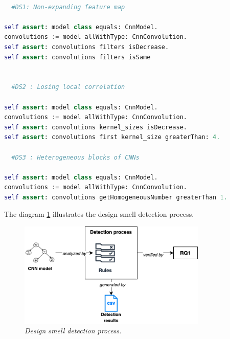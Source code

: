 \begin{lstlisting}[language=Python, caption=\emph{Rules examples for detecting design smells in CNN programs.}\\, label=lst:rules]

  #DS1: Non-expanding feature map

self assert: model class equals: CnnModel.
convolutions := model allWithType: CnnConvolution.
self assert: convolutions filters isDecrease.
self assert: convolutions filters isSame


  #DS2 : Losing local correlation

self assert: model class equals: CnnModel.
convolutions := model allWithType: CnnConvolution.
self assert: convolutions kernel_sizes isDecrease.
self assert: convolutions first kernel_size greaterThan: 4.

  #DS3 : Heterogeneous blocks of CNNs

self assert: model class equals: CnnModel.
convolutions := model allWithType: CnnConvolution.
self assert: convolutions getHomogeneousNumber greaterThan 1.

\end{lstlisting}



The diagram \ref{fig:detection} illustrates the design smell detection process.\\


\begin{figure}[h!]
  \centering
  \includegraphics[width=0.8\textwidth]{figure/design_smell_detection.png}
  \caption{\emph{Design smell detection process.}}
  \label{fig:detection}
\end{figure}

